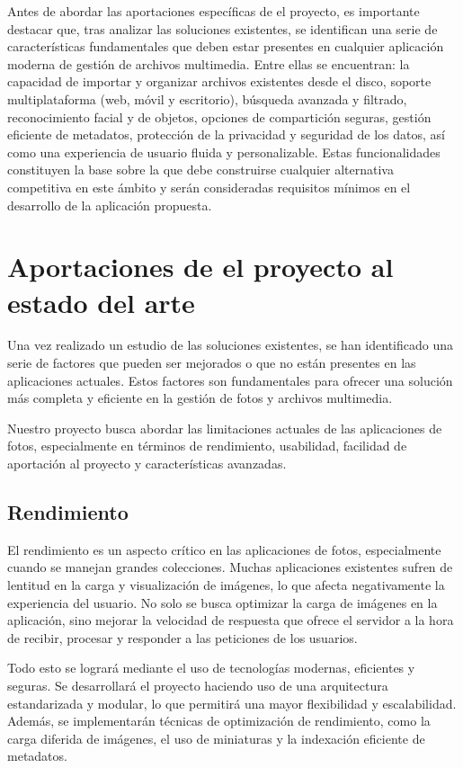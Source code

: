 Antes de abordar las aportaciones específicas de el proyecto, es importante destacar que, tras analizar las soluciones existentes, se identifican una serie de características fundamentales que deben estar presentes en cualquier aplicación moderna de gestión de archivos multimedia. Entre ellas se encuentran: la capacidad de importar y organizar archivos existentes desde el disco, soporte multiplataforma (web, móvil y escritorio), búsqueda avanzada y filtrado, reconocimiento facial y de objetos, opciones de compartición seguras, gestión eficiente de metadatos, protección de la privacidad y seguridad de los datos, así como una experiencia de usuario fluida y personalizable. Estas funcionalidades constituyen la base sobre la que debe construirse cualquier alternativa competitiva en este ámbito y serán consideradas requisitos mínimos en el desarrollo de la aplicación propuesta.

\section{Aportaciones de el proyecto al estado del arte}
Una vez realizado un estudio de las soluciones existentes, se han identificado una serie de factores que pueden ser mejorados o que no están presentes en las aplicaciones actuales. Estos factores son fundamentales para ofrecer una solución más completa y eficiente en la gestión de fotos y archivos multimedia.

Nuestro proyecto busca abordar las limitaciones actuales de las aplicaciones de fotos, especialmente en términos de rendimiento, usabilidad, facilidad de aportación al proyecto y características avanzadas.
\subsection{Rendimiento}
El rendimiento es un aspecto crítico en las aplicaciones de fotos, especialmente cuando se manejan grandes colecciones. Muchas aplicaciones existentes sufren de lentitud en la carga y visualización de imágenes, lo que afecta negativamente la experiencia del usuario.
No solo se busca optimizar la carga de imágenes en la aplicación, sino mejorar la velocidad de respuesta que ofrece el servidor a la hora de recibir, procesar y responder a las peticiones de los usuarios.

Todo esto se logrará mediante el uso de tecnologías modernas, eficientes y seguras.
Se desarrollará el proyecto haciendo uso de una arquitectura estandarizada y modular, lo que permitirá una mayor flexibilidad y escalabilidad. Además, se implementarán técnicas de optimización de rendimiento, como la carga diferida de imágenes, el uso de miniaturas y la indexación eficiente de metadatos.

